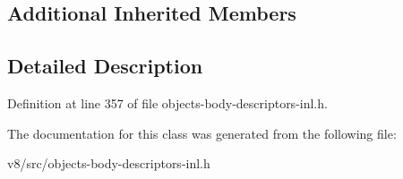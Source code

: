 \subsection*{Additional Inherited Members}


\subsection{Detailed Description}


Definition at line 357 of file objects-\/body-\/descriptors-\/inl.\+h.



The documentation for this class was generated from the following file\+:\begin{DoxyCompactItemize}
\item 
v8/src/objects-\/body-\/descriptors-\/inl.\+h\end{DoxyCompactItemize}
